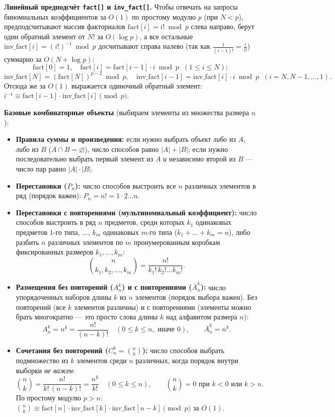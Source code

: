\documentclass[10pt,a4paper]{article}
\renewcommand{\le}{\leqslant}
\renewcommand{\emptyset}{\varnothing}
\newcommand{\fall}[2]{#1^{\underline{#2}}}
\begin{document}
\textbf{Линейный предподсчёт \texttt{fact[]} и \texttt{inv\_fact[]}.} Чтобы отвечать на запросы биномиальных коэффициентов за $O(1)$ по простому модулю $p$ (при $N < p$), предподсчитывают массив факториалов $\mathrm{fact}[i] = i! \bmod p$ слева направо, берут один обратный элемент от $N!$ за $O(\log p)$, а все остальные $\mathrm{inv\_fact}[i] = (i!)^{-1} \bmod p$ досчитывают справа налево (так как $\frac{1}{(i-1)!} = \frac{i}{i!}$) суммарно за $O(N + \log p)$:
\[
  \mathrm{fact}[0] = 1,\quad \mathrm{fact}[i] = \mathrm{fact}[i-1] \cdot i \bmod p \;\;(1 \le i \le N);
\]
\[
  \mathrm{inv\_fact}[N] = (\mathrm{fact}[N])^{p-2} \bmod p,\quad
  \mathrm{inv\_fact}[i-1] = \mathrm{inv\_fact}[i] \cdot i \bmod p \;\;(i = N, N-1, \dots, 1).
\]
Отсюда же за $O(1)$ выражается одиночный обратный элемент: $i^{-1} \equiv \mathrm{fact}[i-1] \cdot \mathrm{inv\_fact}[i] \pmod p$.

\textbf{Базовые комбинаторные объекты} (выбираем элементы из множества размера $n$):
\begin{itemize}
  \item \textbf{Правила суммы и произведения:} если нужно выбрать объект \emph{либо} из $A$, \emph{либо} из $B$ ($A \cap B = \emptyset$), число способов равно $|A| + |B|$; если нужно последовательно выбрать первый элемент из $A$ \emph{и} независимо второй из $B$ — число пар равно $|A| \cdot |B|$.
  \item \textbf{Перестановки ($P_n$):} число способов выстроить все $n$ различных элементов в ряд (порядок важен): $P_n = n! = 1 \cdot 2 \dots n$.
  \item \textbf{Перестановки с повторениями (мультиномиальный коэффициент):} число способов выстроить в ряд $n$ предметов, среди которых $k_1$ одинаковых предметов $1$-го типа, $\dots$, $k_m$ одинаковых $m$-го типа ($k_1 + \dots + k_m = n$), либо разбить $n$ различных элементов по $m$ пронумерованным коробкам фиксированных размеров $k_1, \dots, k_m$:
  \[
    \binom{n}{k_1, k_2, \dots, k_m} = \frac{n!}{k_1!\,k_2!\dots k_m!}.
  \]
  \item \textbf{Размещения без повторений ($A_n^k$) и с повторениями ($\bar{A}_n^k$):} число упорядоченных наборов длины $k$ из $n$ элементов (порядок выбора важен). Без повторений (все $k$ элементов различны) и с повторениями (элементы можно брать многократно — это просто слова длины $k$ над алфавитом размера $n$):
  \[
    A_n^k = \fall{n}{k} = \frac{n!}{(n - k)!} \quad (0 \le k \le n, \text{ иначе } 0), \qquad \bar{A}_n^k = n^k.
  \]
  \item \textbf{Сочетания без повторений ($C_n^k = \binom{n}{k}$):} число способов выбрать подмножество из $k$ элементов среди $n$ различных, когда порядок внутри выборки \emph{не важен}:
  \[
    \binom{n}{k} = \frac{n!}{k!\,(n - k)!} = \frac{\fall{n}{k}}{k!} \quad (0 \le k \le n), \qquad \binom{n}{k} = 0 \text{ при } k < 0 \text{ или } k > n.
  \]
  По простому модулю $p > n$: $\binom{n}{k} \equiv \mathrm{fact}[n] \cdot \mathrm{inv\_fact}[k] \cdot \mathrm{inv\_fact}[n-k] \pmod p$ за $O(1)$.
\end{itemize}
\end{document}
